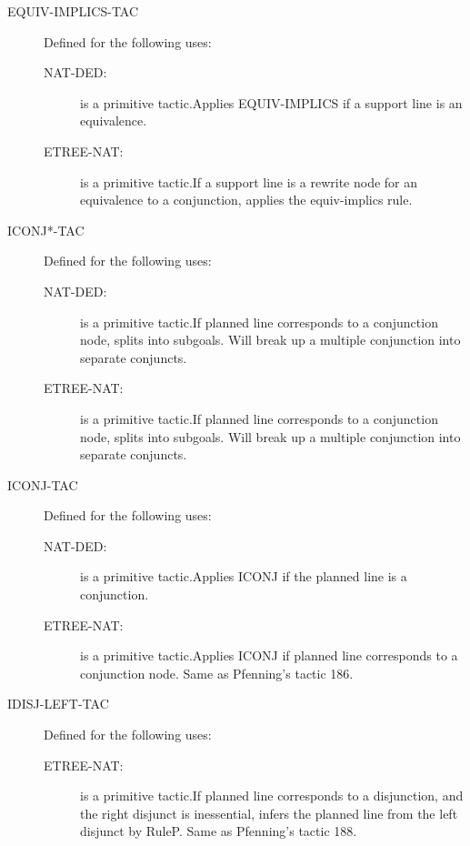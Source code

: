 \begin{description}
\begin{description}
\end{description}

\item[EQUIV-IMPLICS-TAC]  Defined for the following uses:
\begin{description}
\item[NAT-DED:]  is a primitive tactic.Applies EQUIV-IMPLICS if a support line is an equivalence.

\item[ETREE-NAT:]  is a primitive tactic.If a support line is a rewrite node for an equivalence to a
conjunction, applies the equiv-implics rule.

\end{description}

\item[ICONJ*-TAC]  Defined for the following uses:
\begin{description}
\item[NAT-DED:]  is a primitive tactic.If planned line corresponds to a conjunction node, splits into
subgoals.  Will break up a multiple conjunction into separate conjuncts.

\item[ETREE-NAT:]  is a primitive tactic.If planned line corresponds to a conjunction node, splits into
subgoals.  Will break up a multiple conjunction into separate conjuncts.

\end{description}

\item[ICONJ-TAC]  Defined for the following uses:
\begin{description}
\item[NAT-DED:]  is a primitive tactic.Applies ICONJ if the planned line is a conjunction.

\item[ETREE-NAT:]  is a primitive tactic.Applies ICONJ if planned line corresponds to  a conjunction node.
Same as Pfenning's tactic 186.

\end{description}

\item[IDISJ-LEFT-TAC]  Defined for the following uses:
\begin{description}
\item[ETREE-NAT:]  is a primitive tactic.If planned line corresponds to a disjunction, and the right disjunct
is inessential, infers the planned line from the left disjunct by RuleP.
Same as Pfenning's tactic 188.


\end{description}
\end{description}
